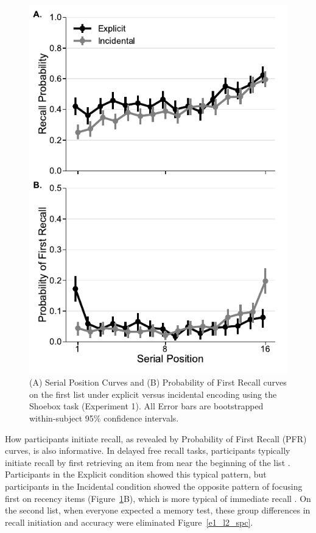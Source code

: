 \documentclass[man,natbib,floatsintext]{apa6} %
\begin{document}
\newcommand\spcpaneltext{All Error bars are bootstrapped within-subject 95\% confidence intervals.}
\begin{figure}
\includegraphics{figures/E1_spc_list1.pdf}
\caption{(A) Serial Position Curves and (B) Probability of First Recall curves on the first list under explicit versus incidental encoding using the Shoebox task (Experiment 1). \spcpaneltext}
\label{e1_l1_spc}
\end{figure}

How participants initiate recall, as revealed by Probability of First Recall (PFR) curves, is also informative. In delayed free recall tasks, participants typically initiate recall by first retrieving an item from near the beginning of the list \citep[i.e., they focus first on primacy items][]{ref}. Participants in the Explicit condition showed this typical pattern, but participants in the Incidental condition showed the opposite pattern of focusing first on recency items (Figure~\ref{e1_l1_spc}B), which is more typical of immediate recall \citep{ref}. On the second list, when everyone expected a memory test, these group differences in recall initiation and accuracy were eliminated Figure~\ref{e1_l2_spc}. 
\end{document}
